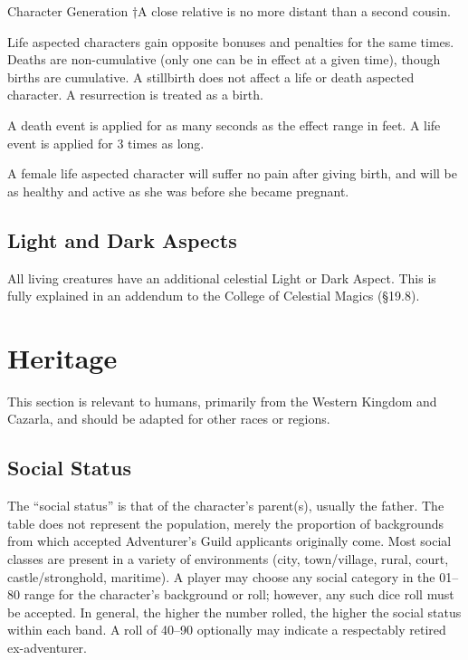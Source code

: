 \begin{Chapter}{Character Generation}
†A close relative is no more distant than a second cousin.

Life aspected characters gain opposite bonuses and penalties for the
same times.  Deaths are non-cumulative (only one can be in effect at a
given time), though births are cumulative.  A stillbirth does not
affect a life or death aspected character. A resurrection is treated
as a birth.

A death event is applied for as many seconds as the effect range in
feet.  A life event is applied for 3 times as long.

A female life aspected character will suffer no pain after giving
birth, and will be as healthy and active as she was before she became
pregnant.

\subsection{Light and Dark Aspects}

All living creatures have an additional celestial Light or Dark
Aspect.  This is fully explained in an addendum to the College of
Celestial Magics (§19.8).


\section{Heritage}
\label{heritage}

This section is relevant to humans, primarily from the Western Kingdom
and Cazarla, and should be adapted for other races or regions.

\subsection{Social Status}

The “social status” is that of the character’s parent(s), usually the
father. The table does not represent the population, merely the
proportion of backgrounds from which accepted Adventurer’s Guild
applicants originally come. Most social classes are present in a
variety of environments (city, town/village, rural, court,
castle/stronghold, maritime).  A player may choose any social category
in the 01--80 range for the character’s background or roll; however,
any such dice roll must be accepted.  In general, the higher the
number rolled, the higher the social status within each band. A roll
of 40--90 optionally may indicate a respectably retired ex-adventurer.


\end{Chapter}
